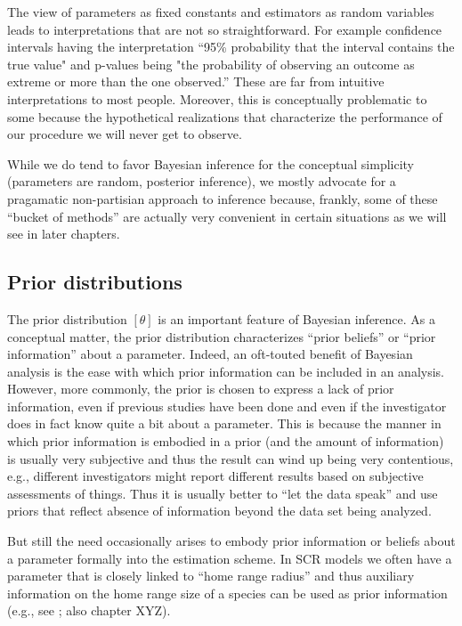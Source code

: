 The view of parameters as fixed constants and estimators as random variables
leads to interpretations that are not so straightforward. For
example confidence intervals having the interpretation ``95\%
probability that the interval contains the true value" and p-values
being "the probability of observing an outcome as extreme or more than
the one observed.'' These are far from intuitive interpretations to
most people.  Moreover, this is conceptually problematic to some
because the hypothetical realizations that characterize the
performance of our procedure we will never get to observe.

While we do tend to favor Bayesian inference for the conceptual
simplicity (parameters are random, posterior inference), we mostly
advocate for a pragamatic non-partisian approach to inference because,
frankly, some of these ``bucket of methods'' are actually very
convenient in certain situations as we will see in later chapters.


\subsection{Prior distributions}


The prior distribution $[\theta]$ is an important feature of Bayesian
inference. As a conceptual matter,
the prior distribution characterizes ``prior beliefs'' or ``prior
information'' about a parameter. Indeed,
an oft-touted benefit of Bayesian analysis is the ease with which
prior information can be included in an analysis.
However, more commonly, the prior is chosen to
express a lack of prior information, even if previous studies have
been done and even if the investigator does in fact know quite a bit
about a parameter.
This is because
the manner in which prior information is embodied in a prior (and the
amount of information) is
usually very subjective and thus the result can wind up being very
contentious, e.g., different investigators might report different
results based on subjective assessments of things. Thus it is usually
better to ``let the data speak'' and use priors that reflect absence
of information beyond the data set being analyzed.

But still the need occasionally arises to embody prior information or
beliefs about a parameter formally into the estimation scheme.
 In SCR models we often have a parameter that is closely linked
to ``home range radius'' and thus auxiliary information on the home
range size of a species can be used as prior information (e.g., see
\citet{chandler_royle:2012} ; also chapter XYZ).

